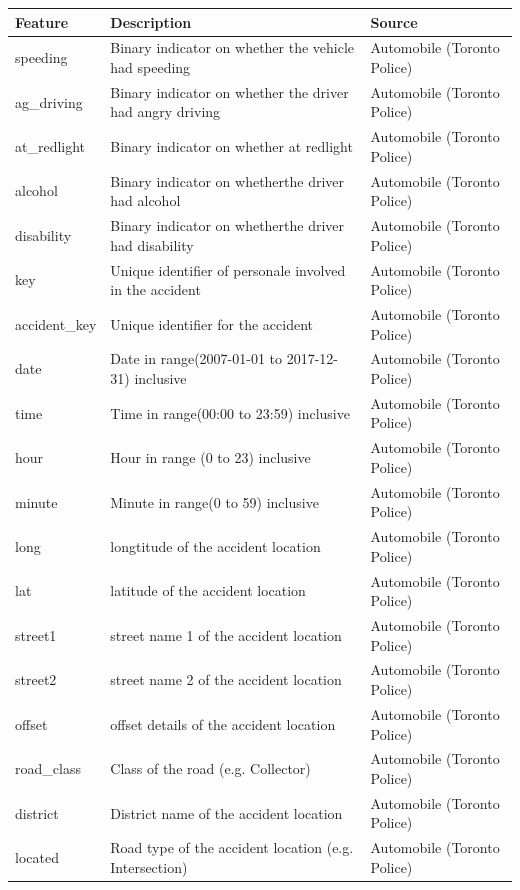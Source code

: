 \documentclass[]{article}
\begin{document}
\begin{table}[H]
\centering
\begin{tabular}{lll}
\toprule
Feature & Description & Source\\
\midrule
speeding & Binary indicator on whether the vehicle had speeding & Automobile (Toronto Police)\\
ag\_driving & Binary indicator on whether the driver had angry driving & Automobile (Toronto Police)\\
at\_redlight & Binary indicator on whether at redlight & Automobile (Toronto Police)\\
alcohol & Binary indicator on whetherthe driver had alcohol & Automobile (Toronto Police)\\
disability & Binary indicator on whetherthe driver had disability & Automobile (Toronto Police)\\
key & Unique identifier of personale involved in the accident & Automobile (Toronto Police)\\
accident\_key & Unique identifier for the accident & Automobile (Toronto Police)\\
date & Date in range(2007-01-01 to 2017-12-31) inclusive & Automobile (Toronto Police)\\
time & Time in range(00:00 to 23:59) inclusive & Automobile (Toronto Police)\\
hour & Hour in range (0 to 23) inclusive & Automobile (Toronto Police)\\
minute & Minute in range(0 to 59) inclusive & Automobile (Toronto Police)\\
long & longtitude of the accident location & Automobile (Toronto Police)\\
lat & latitude of the accident location & Automobile (Toronto Police)\\
street1 & street name 1 of the accident location & Automobile (Toronto Police)\\
street2 & street name 2 of the accident location & Automobile (Toronto Police)\\
offset & offset details of the accident location & Automobile (Toronto Police)\\
road\_class & Class of the road (e.g. Collector) & Automobile (Toronto Police)\\
district & District name of the accident location & Automobile (Toronto Police)\\
located & Road type of the accident location (e.g. Intersection) & Automobile (Toronto Police)\\

\end{tabular}
\end{table}
\end{document}
